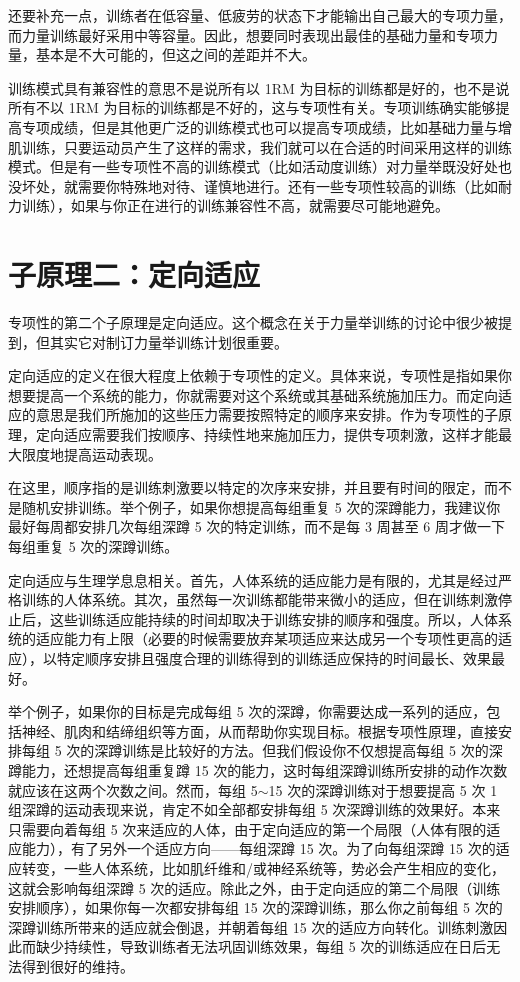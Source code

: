\documentclass[fontset=fandol, a4paper, 12pt, openright]{ctexbook}
\begin{document}
还要补充一点，训练者在低容量、低疲劳的状态下才能输出自己最大的专项力量，而力量训练最好采用中等容量。因此，想要同时表现出最佳的基础力量和专项力量，基本是不大可能的，但这之间的差距并不大。

训练模式具有兼容性的意思不是说所有以 1RM 为目标的训练都是好的，也不是说所有不以 1RM 为目标的训练都是不好的，这与专项性有关。专项训练确实能够提高专项成绩，但是其他更广泛的训练模式也可以提高专项成绩，比如基础力量与增肌训练，只要运动员产生了这样的需求，我们就可以在合适的时间采用这样的训练模式。但是有一些专项性不高的训练模式（比如活动度训练）对力量举既没好处也没坏处，就需要你特殊地对待、谨慎地进行。还有一些专项性较高的训练（比如耐力训练），如果与你正在进行的训练兼容性不高，就需要尽可能地避免。

\section{子原理二：定向适应}

专项性的第二个子原理是定向适应。这个概念在关于力量举训练的讨论中很少被提到，但其实它对制订力量举训练计划很重要。

定向适应的定义在很大程度上依赖于专项性的定义。具体来说，专项性是指如果你想要提高一个系统的能力，你就需要对这个系统或其基础系统施加压力。而定向适应的意思是我们所施加的这些压力需要按照特定的顺序来安排。作为专项性的子原理，定向适应需要我们按顺序、持续性地来施加压力，提供专项刺激，这样才能最大限度地提高运动表现。

在这里，顺序指的是训练刺激要以特定的次序来安排，并且要有时间的限定，而不是随机安排训练。举个例子，如果你想提高每组重复 5 次的深蹲能力，我建议你最好每周都安排几次每组深蹲 5 次的特定训练，而不是每 3 周甚至 6 周才做一下每组重复 5 次的深蹲训练。

定向适应与生理学息息相关。首先，人体系统的适应能力是有限的，尤其是经过严格训练的人体系统。其次，虽然每一次训练都能带来微小的适应，但在训练刺激停止后，这些训练适应能持续的时间却取决于训练安排的顺序和强度。所以，人体系统的适应能力有上限（必要的时候需要放弃某项适应来达成另一个专项性更高的适应），以特定顺序安排且强度合理的训练得到的训练适应保持的时间最长、效果最好。

举个例子，如果你的目标是完成每组 5 次的深蹲，你需要达成一系列的适应，包括神经、肌肉和结缔组织等方面，从而帮助你实现目标。根据专项性原理，直接安排每组 5 次的深蹲训练是比较好的方法。但我们假设你不仅想提高每组 5 次的深蹲能力，还想提高每组重复蹲 15 次的能力，这时每组深蹲训练所安排的动作次数就应该在这两个次数之间。然而，每组 5$\sim$15 次的深蹲训练对于想要提高 5 次 1 组深蹲的运动表现来说，肯定不如全部都安排每组 5 次深蹲训练的效果好。本来只需要向着每组 5 次来适应的人体，由于定向适应的第一个局限（人体有限的适应能力），有了另外一个适应方向——每组深蹲 15 次。为了向每组深蹲 15 次的适应转变，一些人体系统，比如肌纤维和/或神经系统等，势必会产生相应的变化，这就会影响每组深蹲 5 次的适应。除此之外，由于定向适应的第二个局限（训练安排顺序），如果你每一次都安排每组 15 次的深蹲训练，那么你之前每组 5 次的深蹲训练所带来的适应就会倒退，并朝着每组 15 次的适应方向转化。训练刺激因此而缺少持续性，导致训练者无法巩固训练效果，每组 5 次的训练适应在日后无法得到很好的维持。
\end{document}

